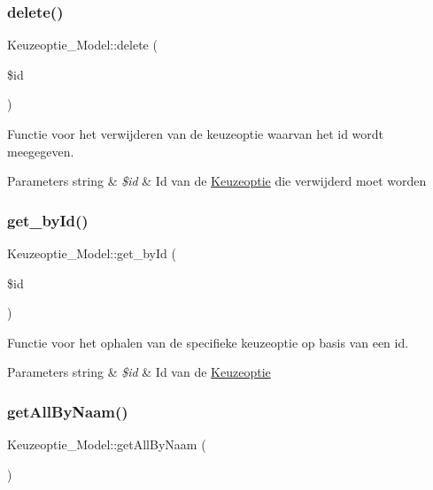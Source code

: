 \subsubsection{\texorpdfstring{delete()}{delete()}}
{\footnotesize\ttfamily Keuzeoptie\+\_\+\+Model\+::delete (\begin{DoxyParamCaption}\item[{}]{\$id }\end{DoxyParamCaption})}

Functie voor het verwijderen van de keuzeoptie waarvan het id wordt meegegeven. 
\begin{DoxyParams}[1]{Parameters}
string & {\em \$id} & Id van de \mbox{\hyperlink{class_keuzeoptie}{Keuzeoptie}} die verwijderd moet worden \\
\hline
\end{DoxyParams}
\mbox{\label{class_keuzeoptie___model_ac16584888f32902c1b65c7b06fd6999a}} 
\subsubsection{\texorpdfstring{get\+\_\+by\+Id()}{get\_byId()}}
{\footnotesize\ttfamily Keuzeoptie\+\_\+\+Model\+::get\+\_\+by\+Id (\begin{DoxyParamCaption}\item[{}]{\$id }\end{DoxyParamCaption})}

Functie voor het ophalen van de specifieke keuzeoptie op basis van een id. 
\begin{DoxyParams}[1]{Parameters}
string & {\em \$id} & Id van de \mbox{\hyperlink{class_keuzeoptie}{Keuzeoptie}} \\
\hline
\end{DoxyParams}
\mbox{\label{class_keuzeoptie___model_a9e17f249c95fd5a6a3d5e6222b048b4c}} 
\subsubsection{\texorpdfstring{get\+All\+By\+Naam()}{getAllByNaam()}}
{\footnotesize\ttfamily Keuzeoptie\+\_\+\+Model\+::get\+All\+By\+Naam (\begin{DoxyParamCaption}{ }\end{DoxyParamCaption})}


